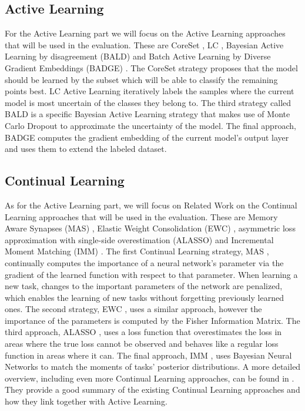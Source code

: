 \documentclass[expose, en]{thesis}
\begin{document}
\subsection{Active Learning}
For the Active Learning part we will focus on the Active Learning approaches that will be used in the evaluation. These are
CoreSet \cite{sener2017active}, LC \cite{lewis1995sequential}, Bayesian Active Learning by disagreement (BALD) \cite{gal2017deep} 
and Batch Active Learning by Diverse Gradient Embeddings (BADGE) \cite{ash2019deep}. The CoreSet strategy \cite{sener2017active}
proposes that the model should be learned by the subset which will be able to classify the remaining points best. LC Active Learning \cite{lewis1995sequential}
iteratively labels the samples where the current model is most uncertain of the classes they belong to. The third strategy called BALD is a specific Bayesian
Active Learning strategy that makes use of Monte Carlo Dropout \cite{gal2016dropout} to approximate the uncertainty of the model. The final approach,
BADGE computes the gradient embedding of the current model's output layer and uses them to extend the labeled dataset.

\subsection{Continual Learning}
As for the Active Learning part, we will focus on Related Work on the Continual Learning approaches that will be used in the evaluation.
These are Memory Aware Synapses (MAS) \cite{aljundi2018memory}, Elastic Weight Consolidation (EWC) \cite{kirkpatrick2017overcoming},
asymmetric loss approximation with single-side overestimation (ALASSO) \cite{park2019continual} and 
Incremental Moment Matching (IMM) \cite{lee2017overcoming}. The first Continual Learning strategy, MAS \cite{aljundi2018memory}, continually computes the importance of
a neural network's parameter via the gradient of the learned function with respect to that parameter. When learning a new task, changes to the important parameters
of the network are penalized, which enables the learning of new tasks without forgetting previously learned ones. The second strategy, EWC \cite{kirkpatrick2017overcoming},
uses a similar approach, however the importance of the parameters is computed by the Fisher Information Matrix. The third approach, ALASSO \cite{park2019continual},
uses a loss function that overestimates the loss in areas where the true loss cannot be observed and behaves like a regular loss function in areas where it can.
The final approach, IMM \cite{lee2017overcoming}, uses Bayesian Neural Networks to match the moments of tasks' posterior distributions.
A more detailed overview, including even more Continual Learning approaches, can be found in \cite{mundt2020wholistic}. They provide a good summary of the existing
Continual Learning approaches and how they link together with Active Learning. 
\end{document}
